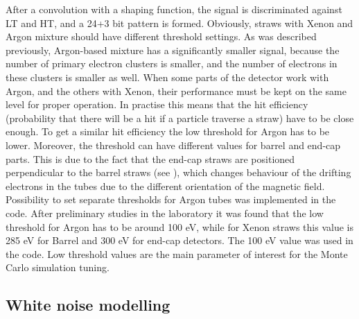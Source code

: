 After a convolution with a shaping function, the signal is discriminated against LT and HT, and a 24+3 bit pattern is formed.
Obviously, straws with Xenon and Argon mixture should have different threshold settings.
As was described previously, Argon-based mixture has a significantly smaller signal, because
the number of primary electron clusters is smaller, and the number of electrons in these clusters is smaller as well.
When some parts of the detector work with Argon, and the others with Xenon, their performance must be kept on the same level for
proper operation. In practise this means that the hit efficiency (probability that there will be a hit if a particle traverse a straw) have to be close enough. 
To get a similar hit efficiency the low threshold for Argon has to be lower.
Moreover, the threshold can have different values for barrel and end-cap parts. This is due to the fact that the end-cap straws are positioned perpendicular to the barrel straws (see ), %
which changes behaviour of the drifting electrons in the tubes due to the different orientation of the magnetic field.
Possibility to set separate thresholds for Argon tubes was implemented in the code.
After preliminary studies in the laboratory it was found that the low threshold for Argon has to be around 100 eV, 
while for Xenon straws this value is 285 eV for Barrel and 300 eV for end-cap detectors. The 100 eV value was used in the code.
Low threshold values are the main parameter of interest for the Monte Carlo simulation tuning.

\subsection{White noise modelling}

